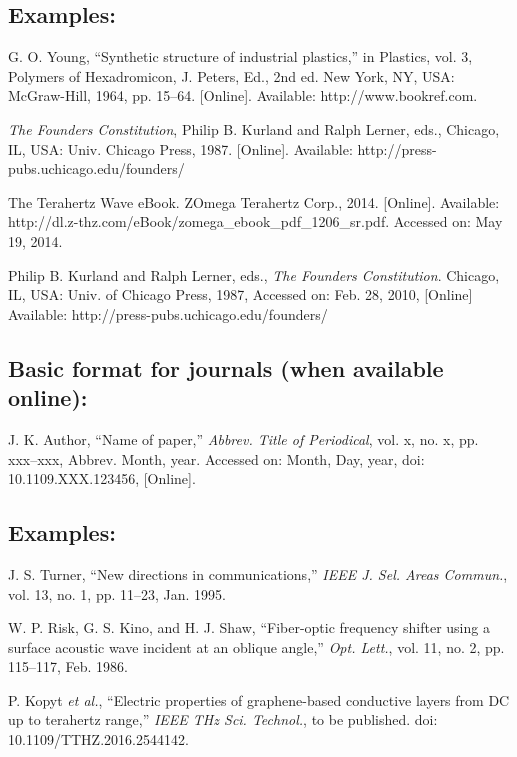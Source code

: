\subsection*{Examples:}

\begin{thebibliography}{34}
\setcounter{enumiv}{9}

\bibitem{}G. O. Young, ``Synthetic structure of industrial plastics,'' in Plastics, vol. 3, Polymers of Hexadromicon, J. Peters, Ed., 2nd ed. New York, NY, USA: McGraw-Hill, 1964, pp. 15--64. [Online]. Available: http://www.bookref.com. 

\bibitem{} {\em The Founders Constitution}, Philip B. Kurland and Ralph Lerner, eds., Chicago, IL, USA: Univ. Chicago Press, 1987. [Online]. Available: http://press-pubs.uchicago.edu/founders/

\bibitem{} The Terahertz Wave eBook. ZOmega Terahertz Corp., 2014. [Online]. Available: http://dl.z-thz.com/eBook/zomega\_ebook\_pdf\_1206\_sr.pdf. Accessed on: May 19, 2014. 

\bibitem{} Philip B. Kurland and Ralph Lerner, eds., {\em The Founders Constitution}. Chicago, IL, USA: Univ. of Chicago Press, 1987, Accessed on: Feb. 28, 2010, [Online] Available: http://press-pubs.uchicago.edu/founders/ 
\end{thebibliography}

\subsection*{Basic format for journals (when available online):}

J. K. Author, ``Name of paper,'' {\em Abbrev. Title of Periodical}, vol. x, no. x, pp. xxx--xxx, Abbrev. Month, year. Accessed on: Month, Day, year, doi: 10.1109.XXX.123456, [Online].

\subsection*{Examples:}

\begin{thebibliography}{34}
\setcounter{enumiv}{13}

\bibitem{}J. S. Turner, ``New directions in communications,'' {\em IEEE J. Sel. Areas Commun.}, vol. 13, no. 1, pp. 11--23, Jan. 1995. 

\bibitem{} W. P. Risk, G. S. Kino, and H. J. Shaw, ``Fiber-optic frequency shifter using a surface acoustic wave incident at an oblique angle,'' {\em Opt. Lett.}, vol. 11, no. 2, pp. 115--117, Feb. 1986.

\bibitem{} P. Kopyt {\em et al.}, ``Electric properties of graphene-based conductive layers from DC up to terahertz range,'' {\em IEEE THz Sci. Technol.}, to be published. doi: 10.1109/TTHZ.2016.2544142.
\end{thebibliography}

